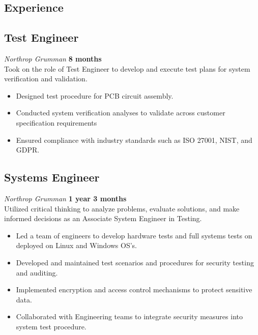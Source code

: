 \documentclass[letterpaper,10pt]{article}
\begin{document}
\begin{paracol}{2}
\begin{leftcolumn}
\section*{Experience}

\subsection*{Test Engineer}
\textit{Northrop Grumman} \hfill \textbf{8 months}\\\vspace{2mm}
\sloppy
Took on the role of Test Engineer to develop and execute test plans for system verification and validation. \\
\begin{itemize}[leftmargin=0.10in]
    \item Designed test procedure for PCB circuit assembly.
    \item Conducted system verification analyses to validate across customer specification requirements
    \item Ensured compliance with industry standards such as ISO 27001, NIST, and GDPR.
\end{itemize}

\subsection*{Systems Engineer}
\textit{Northrop Grumman} \hfill \textbf{1 year 3 months}\\\vspace{2mm}
\sloppy
Utilized critical thinking to analyze problems, evaluate solutions, and make informed decisions as an Associate System Engineer in Testing. \\
\begin{itemize}[leftmargin=0.10in]
    \item Led a team of engineers to develop hardware tests and full systems tests on deployed on Linux and Windows OS's.
    \item Developed and maintained test scenarios and procedures for security testing and auditing.
    \item Implemented encryption and access control mechanisms to protect sensitive data.
    \item Collaborated with Engineering teams to integrate security measures into system test procedure.
\end{itemize}


\end{leftcolumn}
\end{paracol}
\end{document}

